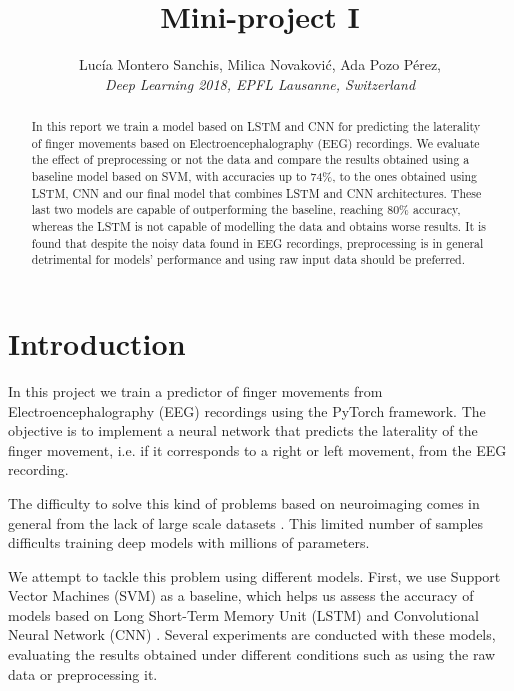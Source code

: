 \documentclass[10pt,conference,compsocconf]{IEEEtran}
\begin{document}
\title{Mini-project I}

\author{
  Luc\'{i}a Montero Sanchis, Milica Novakovi\'{c}, Ada Pozo P\'{e}rez,\\
  \textit{Deep Learning 2018, EPFL Lausanne, Switzerland}
}

\maketitle

\begin{abstract}
In this report we train a model based on LSTM and CNN for predicting the laterality of finger movements based on Electroencephalography (EEG) recordings. We evaluate the effect of preprocessing or not the data and compare the results obtained using a baseline model based on SVM, with accuracies up to 74\%, to the ones obtained using LSTM, CNN and our final model that combines LSTM and CNN architectures. These last two models are capable of outperforming the baseline, reaching 80\% accuracy, whereas the LSTM is not capable of modelling the data and obtains worse results. It is found that despite the noisy data found in EEG recordings, preprocessing is in general detrimental for models' performance and using raw input data should be preferred.

\end{abstract}

\section{Introduction}
In this project we train a predictor of finger movements from Electroencephalography (EEG) recordings using the PyTorch framework. The objective is to implement a neural network that predicts the laterality of the finger movement, i.e. if it corresponds to a right or left movement, from the EEG recording.

The difficulty to solve this kind of problems based on neuroimaging comes in general from the lack of large scale datasets \cite{BashivanRYC15}. This limited number of samples difficults training deep models with millions of parameters.


We attempt to tackle this problem using different models. First, we use Support Vector Machines (SVM) \cite{BashivanRYC15} as a baseline, which helps us assess the accuracy of models based on Long Short-Term Memory Unit (LSTM) \cite{BashivanRYC15, LSTM} and Convolutional Neural Network (CNN) \cite{BashivanRYC15, SchirrmeisterSF17}. Several experiments are conducted with these models, evaluating the results obtained under different conditions such as using the raw data or preprocessing it.
\end{document}
